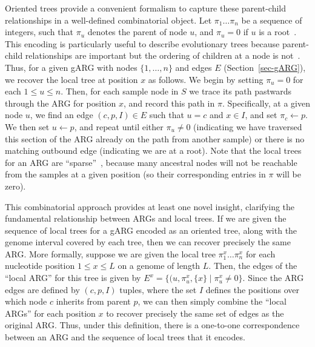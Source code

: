 \documentclass{article}
\begin{document}
Oriented trees provide a
convenient formalism to capture these parent-child relationships
in a well-defined combinatorial object.
Let $\pi_1\dots\pi_n$ be a sequence of integers, such that $\pi_u$
denotes the parent of node $u$, and $\pi_u = 0$ if $u$ is a
root~\cite[p.\ 461]{knuth11combinatorial}.
This encoding is particularly useful to describe
evolutionary trees because parent-child relationships are
important but the ordering of children at a node is
not~\citep{kelleher2013coalescent,kelleher2014coalescent,
kelleher2016efficient}.
Thus, for a given gARG with nodes $\{1, \dots, n\}$ and
edges $E$ (Section~\ref{sec-gARG}), we recover the local tree
at position $x$ as follows.
We begin by setting $\pi_u = 0$ for each $1 \leq u \leq n$.
Then, for each sample node in $S$ we trace its path pastwards through the
ARG for position $x$, and record this path in $\pi$.
Specifically, at a given node $u$,
we find an edge $(c, p, I) \in E$ such that $u = c$ and $x \in I$, and set
$\pi_c \leftarrow p$. We then set $u \leftarrow p$, and repeat
until either $\pi_u \neq 0$ (indicating we have traversed this section
of the ARG already on the path from another sample) or there
is no matching outbound edge (indicating we are at a root).
Note that the local trees for an ARG are ``sparse''~\citep{kelleher2016efficient},
because many ancestral nodes will not be reachable from the
samples at a given position (so their corresponding entries in $\pi$ will be zero).

This combinatorial approach provides at least
one novel insight, clarifying the fundamental relationship between
ARGs and local trees.
If we are given the sequence of local trees for a gARG
encoded as an oriented tree, along with the genome interval
covered by each tree, then we can recover precisely the same ARG.
More formally, suppose we are given the local tree $\pi^x_1\dots\pi^x_n$
for each nucleotide position $1 \leq x \leq L$ on a genome of length $L$.
Then, the edges of the ``local ARG'' for this tree is given by
$E^x = \{(u, \pi_u^x, \{x\} \mid \pi_u^x \neq 0\}$. Since the ARG
edges are defined by $(c, p, I)$ tuples, where the set $I$ defines
the positions over which node $c$ inherits from parent $p$, we can
then simply combine the ``local ARGs'' for each position $x$
to recover precisely the same set of edges as the original ARG.
Thus, under this definition, there
is a one-to-one correspondence between an ARG and
the sequence of local trees that it encodes.
\end{document}
